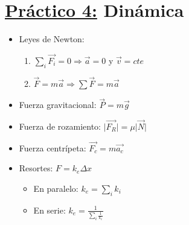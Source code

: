 \documentclass[12pt,a4paper]{article}
\providecommand{\abs}[1]{\lvert#1\rvert}
\begin{document}
	\section*{\underline{Práctico 4:} Dinámica}
		\begin{multicols}{2}
			\begin{itemize}
				\item Leyes de Newton:
				\begin{enumerate}
					\item $\sum_{i} \vec{F_{i}} = 0 \Rightarrow \vec{a} = 0$ y $\vec{v} = cte$
					\item $\vec{F} = m \vec{a} \Rightarrow \sum \vec{F} = m \vec{a}$
				\end{enumerate}
				\item Fuerza gravitacional: $\vec{P} = m \vec{g}$
				\item Fuerza de rozamiento: $\abs{\vec{F_{R}}} = \mu \abs{\vec{N}}$
				\item Fuerza centrípeta: $\vec{F_{c}} = m \vec{a_{c}}$
				\item Resortes: $F = k_{e} \Delta x$
				\begin{itemize}
					\item En paralelo: $k_{e} = \sum_{i} k_{i}$
					\item En serie: $k_{e} = \frac{1}{\sum_{i} \frac{1}{k_{e}}}$
				\end{itemize}
			\end{itemize}
		\end{multicols}
\end{document}
